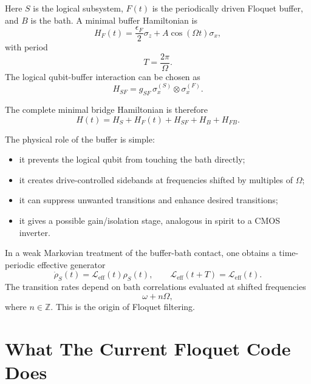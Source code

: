 \documentclass[11pt]{article}
\begin{document}
Here $S$ is the logical subsystem, $F(t)$ is the periodically driven Floquet buffer, and $B$ is
the bath.  A minimal buffer Hamiltonian is
\begin{equation}
    H_F(t)
    =
    \frac{\epsilon_F}{2}\sigma_z
    +
    A\cos(\Omega t)\sigma_x,
\end{equation}
with period
\begin{equation}
    T = \frac{2\pi}{\Omega}.
\end{equation}
The logical qubit-buffer interaction can be chosen as
\begin{equation}
    H_{SF}
    =
    g_{SF}\,
    \sigma_x^{(S)}\otimes\sigma_x^{(F)}.
\end{equation}

The complete minimal bridge Hamiltonian is therefore
\begin{equation}
    H(t)
    =
    H_S
    +
    H_F(t)
    +
    H_{SF}
    +
    H_B
    +
    H_{FB}.
\end{equation}

The physical role of the buffer is simple:
\begin{itemize}[leftmargin=2em]
    \item it prevents the logical qubit from touching the bath directly;
    \item it creates drive-controlled sidebands at frequencies shifted by multiples of $\Omega$;
    \item it can suppress unwanted transitions and enhance desired transitions;
    \item it gives a possible gain/isolation stage, analogous in spirit to a CMOS inverter.
\end{itemize}

In a weak Markovian treatment of the buffer-bath contact, one obtains a time-periodic
effective generator
\begin{equation}
    \dot{\rho}_S(t)
    =
    \mathcal{L}_{\mathrm{eff}}(t)\rho_S(t),
    \qquad
    \mathcal{L}_{\mathrm{eff}}(t+T)
    =
    \mathcal{L}_{\mathrm{eff}}(t).
\end{equation}
The transition rates depend on bath correlations evaluated at shifted frequencies
\begin{equation}
    \omega + n\Omega,
\end{equation}
where $n\in\mathbb{Z}$.  This is the origin of Floquet filtering.

\section{What The Current Floquet Code Does}
\end{document}
